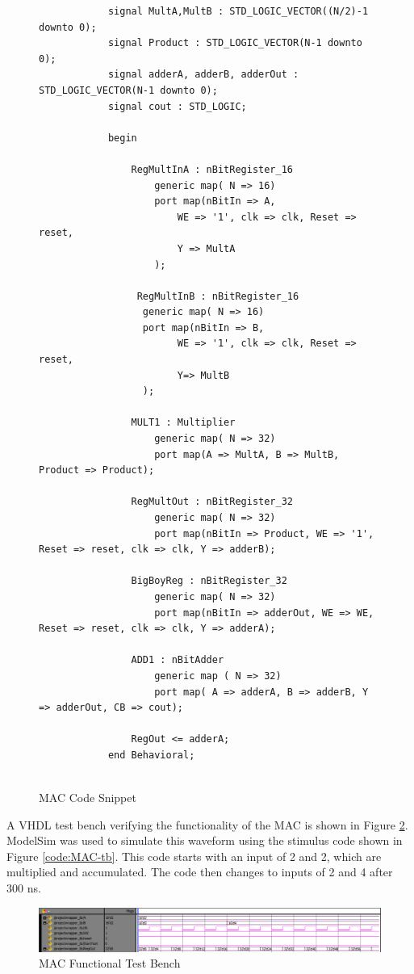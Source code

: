 \documentclass[11pt]{article}
\begin{document}
		
		\begin{figure}[H]
			\centering
			\begin{verbatim}
	        signal MultA,MultB : STD_LOGIC_VECTOR((N/2)-1 downto 0);
	        signal Product : STD_LOGIC_VECTOR(N-1 downto 0);
	        signal adderA, adderB, adderOut : STD_LOGIC_VECTOR(N-1 downto 0);
	        signal cout : STD_LOGIC;
	    
	        begin
	        
	            RegMultInA : nBitRegister_16
	                generic map( N => 16)
	                port map(nBitIn => A,
	                    WE => '1', clk => clk, Reset => reset, 
	                    Y => MultA
	                );
	        		  
	        	 RegMultInB : nBitRegister_16
	        	  generic map( N => 16)
	        	  port map(nBitIn => B,
	        			WE => '1', clk => clk, Reset => reset, 
	        			Y=> MultB
	        	  );
	        	
	            MULT1 : Multiplier
	                generic map( N => 32)
	                port map(A => MultA, B => MultB, Product => Product);
	        
	            RegMultOut : nBitRegister_32
	                generic map( N => 32)
	                port map(nBitIn => Product, WE => '1', Reset => reset, clk => clk, Y => adderB);
	        
	            BigBoyReg : nBitRegister_32
	                generic map( N => 32)
	                port map(nBitIn => adderOut, WE => WE, Reset => reset, clk => clk, Y => adderA);
	        
	            ADD1 : nBitAdder
	                generic map ( N => 32)
	                port map( A => adderA, B => adderB, Y => adderOut, CB => cout);
	        		  
	        	RegOut <= adderA;
	        end Behavioral;
	
	        \end{verbatim}
	        \caption{MAC Code Snippet} 
	    	\label{code:MAC} 
	    \end{figure}
    
	    A VHDL test bench verifying the functionality of the MAC is shown in Figure \ref{fig:MAC-16bit-Test-Bench}. ModelSim was used to simulate this waveform using the stimulus code shown in Figure \ref{code:MAC-tb}. This code starts with an input of 2 and 2, which are multiplied and accumulated. The code then changes to inputs of 2 and 4 after 300 ns.
		
		\begin{figure}[H] 
			\centering 
			\includegraphics[width=\textwidth,height=\dimexpr\textheight-4\baselineskip-\abovecaptionskip-\belowcaptionskip\relax,keepaspectratio]{"Pictures/MAC-Test-Bench-Cropped"}
			\caption{MAC Functional Test Bench} 
			\label{fig:MAC-16bit-Test-Bench} 
		\end{figure}
		
\end{document}
